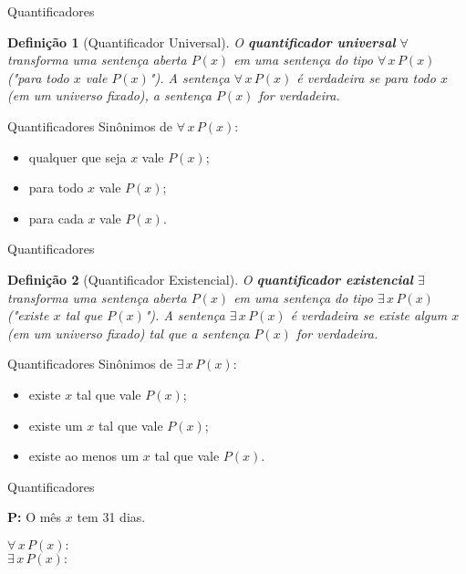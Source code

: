 \documentclass[10pt]{beamer}
\renewcommand{\indent}{\hspace*{2em}}
\theoremstyle{plain}
\newtheorem{defn}{Definição}[section]
\begin{document}
\begin{frame}{Quantificadores}
    \begin{defn}[Quantificador Universal] 
    \vfill\indent O \textbf{quantificador universal} $\forall$ transforma uma sentença aberta $P(x)$ em uma sentença do tipo $\forall\,x\,P(x)$ ("para todo $x$ vale $P(x)$"). A sentença $\forall\,x\,P(x)$ é verdadeira se \emph{para todo} $x$ (em um universo fixado), a sentença $P(x)$ for verdadeira.
    \end{defn}
\end{frame}

\begin{frame}{Quantificadores}
    \indent Sinônimos de $\forall\,x\,P(x)$:
    \begin{itemize}
        \item qualquer que seja $x$ vale $P(x)$;
        \item para todo $x$ vale $P(x)$;
        \item para cada $x$ vale $P(x)$.
    \end{itemize}
\end{frame}

\begin{frame}{Quantificadores}
    \begin{defn}[Quantificador Existencial]
    \vfill\indent O \textbf{quantificador existencial} $\exists$ transforma uma sentença aberta $P(x)$ em uma sentença do tipo $\exists\,x\,P(x)$ ("existe $x$ tal que $P(x)$"). A sentença $\exists\,x\,P(x)$ é verdadeira se \emph{existe algum} $x$ (em um universo fixado) tal que a sentença $P(x)$ for verdadeira.
    \end{defn}
\end{frame}

\begin{frame}{Quantificadores}
    \indent Sinônimos de $\exists\,x\,P(x)$:
    \begin{itemize}
        \item existe $x$ tal que vale $P(x)$;
        \item existe um $x$ tal que vale $P(x)$;
        \item existe ao menos um $x$ tal que vale $P(x)$.
    \end{itemize}
\end{frame}

\begin{frame}{Quantificadores}
    \begin{block}{}
     \textbf{P:} O mês $x$ tem 31 dias.
    \end{block}
    $$$$
    $\forall\,x\,P(x):$
    $$$$
    $$$$
    $\exists\,x\,P(x):$
\end{frame}
\end{document}
